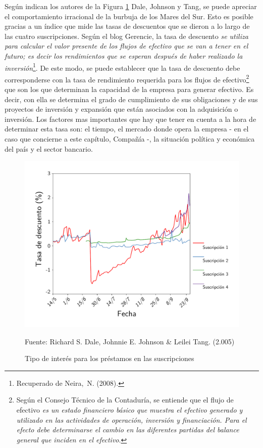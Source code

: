 Según indican los autores de la Figura \ref{fig:tasaDeDescuento} Dale, Johnson y Tang, se puede apreciar el comportamiento irracional de la burbuja de los Mares del Sur. Esto es posible gracias a un índice que mide las tasas de descuentos que se dieron a lo largo de las cuatro suscripciones. Según el blog Gerencie, la tasa de descuento \emph{se utiliza para calcular el valor presente de los flujos de efectivo que se van a tener en el futuro; es decir los rendimientos que se esperan después de haber realizado la inversión}\footnote{Recuperado de Neira, N. (2008).}. De este modo, se puede establecer que la tasa de descuento debe corresponderse con la tasa de rendimiento requerida para los flujos de efectivo\footnote{ Según el Consejo Técnico de la Contaduría, se entiende que el flujo de efectivo \emph{es un estado financiero básico que muestra el efectivo generado y utilizado en las actividades de operación, inversión y financiación. Para el efecto debe determinarse el cambio en las diferentes partidas del balance general que inciden en el efectivo}. } que son los que determinan la capacidad de la empresa para generar efectivo. Es decir, con ella se determina el grado de cumplimiento de sus obligaciones y de sus proyectos de inversión y expansión que están asociados con la adquisición o inversión. Los factores mas importantes que hay que tener en cuenta a la hora de determinar esta tasa son: el tiempo, el mercado donde opera la empresa - en el caso que concierne a este capítulo, Compañía -, la situación política y económica del país y el sector bancario.

\begin{figure}[h!]
	\caption{Tipo de interés para los préstamos en las suscripciones}
	\centering
	\includegraphics[width=150mm]{capitulos/graficos/tasaDeDescuento}
	\label{fig:tasaDeDescuento}

	\footnotesize
	Fuente: Richard S. Dale, Johnnie E. Johnson \& Leilei Tang. (2.005)

\end{figure}

